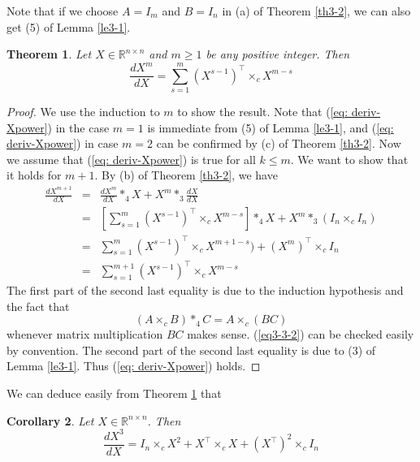 \documentclass[11pt, oneside]{article}  %
\newtheorem{thm}{Theorem}[section]
\newtheorem{cor}[thm]{Corollary}
\newcommand{\RR}{\mathbb{R}}
\newcommand{\beq}{\begin{equation}}
\newcommand{\eeq}{\end{equation}}
\newcommand{\beyy}{\begin{eqnarray*}}
\newcommand{\eeyy}{\end{eqnarray*}}
\begin{document}
Note that if we choose $A=I_{m}$ and $B=I_{n}$ in (a) of Theorem \ref{th3-2},  we can also get (5) of Lemma \ref{le3-1}.

\begin{thm}\label{th3-3}
Let $X\in\RR^{n\times n}$ and $m\ge 1$ be any positive integer.  Then
\beq\label{eq: deriv-Xpower}
\frac{dX^{m}}{d X}=\sum_{s=1}^{m} (X^{s-1})^{\top}\times_{c} X^{m-s}  
\eeq
\end{thm}
\begin{proof}
We use the induction to $m$ to show the result. Note that (\ref{eq: deriv-Xpower}) in the case $m=1$ is immediate from (5) of Lemma 
\ref{le3-1}, and (\ref{eq: deriv-Xpower}) in case $m=2$ can be confirmed by (c) of  Theorem \ref{th3-2}. Now we assume that  
(\ref{eq: deriv-Xpower}) is true for all $k\le m$. We want to show that it holds for $m+1$.  By (b) of Theorem \ref{th3-2}, we have 
\beyy\label{eq:th3-3-1}
\frac{d X^{m+1}}{dX} 
& =& \frac{d X^{m}}{dX}\ast_{4} X + X^{m}\ast_{3} \frac{d X}{dX} \\
& =&\left[\sum_{s=1}^{m} (X^{s-1})^{\top}\times_{c} X^{m-s}\right] \ast_{4} X + X^{m}\ast_{3}(I_{n}\times_{c} I_{n}) \\
& =& \sum_{s=1}^{m}(X^{s-1})^{\top}\times_{c} X^{m+1-s})  + (X^{m})^{\top} \times_{c} I_{n} \\
& =& \sum_{s=1}^{m+1} (X^{s-1})^{\top}\times_{c} X^{m-s} 
\eeyy
The first part of the second last equality is due to the induction hypothesis and the fact that 
\beq\label{eq3-3-2}
(A\times_{c} B)\ast_{4} C = A\times_{c} (BC) 
\eeq
whenever matrix multiplication $BC$ makes sense.  (\ref{eq3-3-2}) can be checked easily by convention. The second part of the second last 
equality is due to (3) of Lemma \ref{le3-1}.  Thus (\ref{eq: deriv-Xpower}) holds.     
\end{proof}

We can deduce easily from Theorem \ref{th3-3} that 
\begin{cor}\label{co3-4}
Let $X\in\RR^{n\times n}$. Then   
\beq\label{eq:th3-3-3}
\frac{dX^{3}}{d X}= I_{n}\times_{c} X^{2} + X^{\top}\times_{c} X + (X^{\top})^{2}\times_{c} I_{n}  
\eeq
\end{cor}
\end{document}
